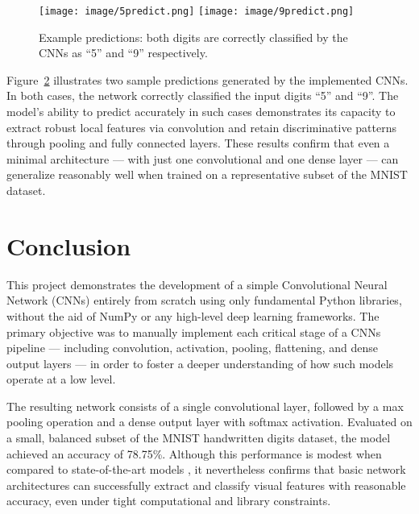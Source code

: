 \documentclass[conference]{IEEEtran}
\begin{document}
\begin{figure}[!h]
\centering

\label{fig:accuracy}
\end{figure}

\begin{figure}[!h]
\centering
\texttt{[image: image/5predict.png]}
\texttt{[image: image/9predict.png]}
\caption{Example predictions: both digits are correctly classified by the CNNs as ``5'' and ``9'' respectively.}
\label{fig:predicted_examples_horizontal}
\end{figure}

Figure~\ref{fig:predicted_examples_horizontal} illustrates two sample predictions generated by the implemented CNNs. In both cases, the network correctly classified the input digits “5” and “9”. The model’s ability to predict accurately in such cases demonstrates its capacity to extract robust local features via convolution and retain discriminative patterns through pooling and fully connected layers. These results confirm that even a minimal architecture — with just one convolutional and one dense layer — can generalize reasonably well when trained on a representative subset of the MNIST dataset.

\section{Conclusion}

This project demonstrates the development of a simple Convolutional Neural Network (CNNs) entirely from scratch using only fundamental Python libraries, without the aid of NumPy or any high-level deep learning frameworks. The primary objective was to manually implement each critical stage of a CNNs pipeline — including convolution, activation, pooling, flattening, and dense output layers — in order to foster a deeper understanding of how such models operate at a low level.

The resulting network consists of a single convolutional layer, followed by a max pooling operation and a dense output layer with softmax activation. Evaluated on a small, balanced subset of the MNIST handwritten digits dataset, the model achieved an accuracy of 78.75\%. Although this performance is modest when compared to state-of-the-art models \cite{lecun2015deep}, it nevertheless confirms that basic network architectures can successfully extract and classify visual features with reasonable accuracy, even under tight computational and library constraints.
\end{document}
